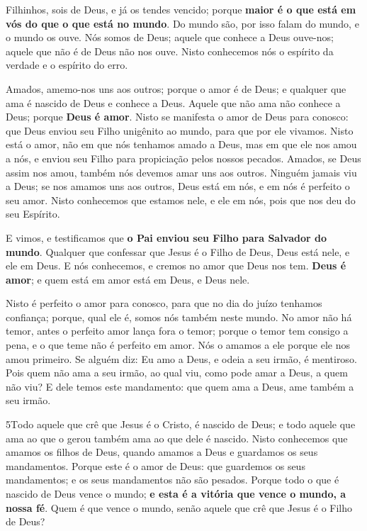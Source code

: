 Filhinhos, sois de Deus, e já os tendes vencido; porque
\textbf{maior é o que está em vós do que o que está no mundo}.
Do mundo são, por isso falam do mundo, e o mundo os ouve.
Nós somos de Deus; aquele que conhece a Deus ouve-nos; aquele
que não é de Deus não nos ouve. Nisto conhecemos nós o espírito da
verdade e o espírito do erro.

Amados, amemo-nos uns aos outros; porque o amor é de Deus; e
qualquer que ama é nascido de Deus e conhece a Deus. Aquele que
não ama não conhece a Deus; porque \textbf{Deus é amor}. Nisto
se manifesta o amor de Deus para conosco: que Deus enviou seu Filho
unigênito ao mundo, para que por ele vivamos. Nisto está o
amor, não em que nós tenhamos amado a Deus, mas em que ele nos amou
a nós, e enviou seu Filho para propiciação pelos nossos pecados.
Amados, se Deus assim nos amou, também nós devemos amar uns
aos outros. Ninguém jamais viu a Deus; se nos amamos uns aos
outros, Deus está em nós, e em nós é perfeito o seu amor.
Nisto conhecemos que estamos nele, e ele em nós, pois que nos
deu do seu Espírito.

E vimos, e testificamos que \textbf{o Pai enviou seu Filho para
Salvador do mundo}. Qualquer que confessar que Jesus é o
Filho de Deus, Deus está nele, e ele em Deus. E nós
conhecemos, e cremos no amor que Deus nos tem. \textbf{Deus é amor};
e quem está em amor está em Deus, e Deus nele.

Nisto é perfeito o amor para conosco, para que no dia do juízo
tenhamos confiança; porque, qual ele é, somos nós também neste
mundo. No amor não há temor, antes o perfeito amor lança fora
o temor; porque o temor tem consigo a pena, e o que teme não é
perfeito em amor. Nós o amamos a ele porque ele nos amou
primeiro. Se alguém diz: Eu amo a Deus, e odeia a seu irmão,
é mentiroso. Pois quem não ama a seu irmão, ao qual viu, como pode
amar a Deus, a quem não viu? E dele temos este mandamento:
que quem ama a Deus, ame também a seu irmão.

\medskip

\lettrine{5} Todo aquele que crê que Jesus é o Cristo,
é nascido de Deus; e todo aquele que ama ao que o gerou também ama
ao que dele é nascido. Nisto conhecemos que amamos os filhos de
Deus, quando amamos a Deus e guardamos os seus mandamentos.
Porque este é o amor de Deus: que guardemos os seus mandamentos;
e os seus mandamentos não são pesados. Porque todo o que é
nascido de Deus vence o mundo; \textbf{e esta é a vitória que vence
o mundo, a nossa fé}. Quem é que vence o mundo, senão aquele que
crê que Jesus é o Filho de Deus?

